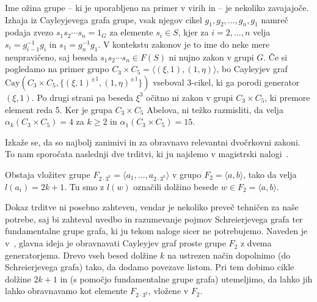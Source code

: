 \begin{opomba} %
Ime ožina grupe -- ki je uporabljeno na primer v virih \cite{Schleimer_2001} in \cite{Schneider_2016}  -- je nekoliko zavajajoče. Izhaja iz Cayleyjevega grafa grupe, vsak njegov cikel $g_1 , g_2, \ldots, g_n, g_1$ namreč
podaja zvezo $s_1 s_2 \cdots s_n = 1_G$ za elemente $s_i \in S$, kjer za $i = 2, \ldots, n$ velja $s_i = g_{i - 1}^{-1} g_i$ in $s_1 = g_n^{-1} g_1$.
V kontekstu zakonov je to ime do neke mere neupravičeno, saj beseda $s_1 s_2 \cdots s_n \in F(S)$ ni nujno zakon v grupi $G$. Če si pogledamo na primer grupo $C_3 \times C_5 = \langle (\xi, 1), (1, \eta) \rangle$,
bo Cayleyjev graf $\text{Cay}(C_3 \times C_5, \{ (\xi, 1)^{\pm 1} , (1, \eta)^{\pm 1} \})$ vseboval 3-cikel, ki ga porodi generator $(\xi , 1)$. Po drugi strani pa beseda $\xi^3$ očitno ni zakon v grupi $C_3 \times C_5$, ki premore element reda 5.
Ker je grupa $C_3 \times C_5$ Abelova, ni težko razmisliti, da velja $\alpha_k(C_3 \times C_5) = 4$ za $k \ge 2$ in $\alpha_1(C_3 \times C_5) = 15$. 

\end{opomba}

Izkaže se, da so najbolj zanimivi in za obravnavo relevantni dvočrkovni zakoni. To nam sporočata naslednji dve trditvi, ki ju najdemo v magistrski nalogi~\cite[str.~5]{Schneider_2016}.
\begin{trditev}
\label{trd_vlozitev_proste_grupe}
 Obstaja vložitev grupe $F_{2 \cdot 3^{k}} = \langle a_1, \ldots, a_{2 \cdot 3^{k}} \rangle$ v grupo $F_2 = \langle a,b \rangle $, tako da velja $l(a_i) = 2k + 1$. Tu smo z $l(w)$ označili dolžino besede $w \in F_2 = \langle a,b \rangle$. 
\end{trditev}


\begin{dokaz}
Dokaz trditve ni posebno zahteven, vendar je nekoliko preveč tehničen za naše potrebe, saj bi zahteval uvedbo in razumevanje pojmov Schreierjevega grafa ter fundamentalne grupe grafa, ki ju tekom naloge sicer ne potrebujemo. Naveden je v~\cite[str.~5]{Schneider_2016}, glavna ideja je obravnavati Cayleyjev graf proste grupe $F_2$ z dvema generatorjema.
Drevo vseh besed dolžine $k$ na ustrezen način dopolnimo (do Schreierjevega grafa) tako, da dodamo povezave listom. Pri tem dobimo cikle dolžine $2k + 1$ in (s pomočjo fundamentalne grupe grafa) utemeljimo, da lahko jih lahko obravnavamo kot elemente $F_{2 \cdot 3^{k}}$, vložene v $F_2$. 
\end{dokaz}


